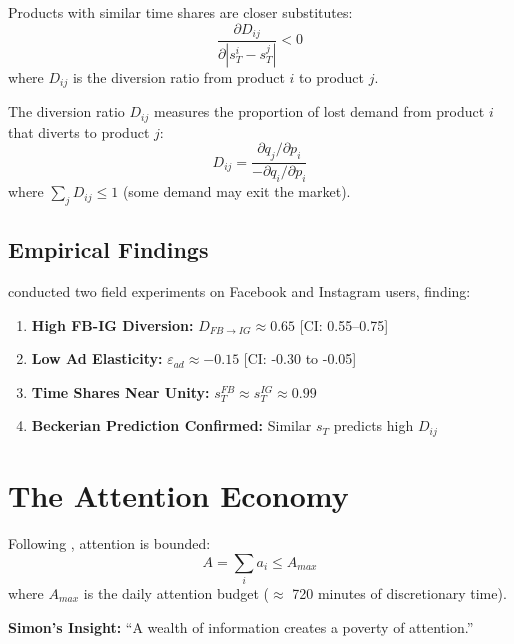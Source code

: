 \begin{axiom}
\label{ax:ta-substitution}
Products with similar time shares are closer substitutes:
\[
\frac{\partial D_{ij}}{\partial |s_T^i - s_T^j|} < 0
\]
where $D_{ij}$ is the diversion ratio from product $i$ to product $j$.
\end{axiom}

\begin{definition}
The diversion ratio $D_{ij}$ measures the proportion of lost demand from product $i$ that diverts to product $j$:
\[
D_{ij} = \frac{\partial q_j / \partial p_i}{-\partial q_i / \partial p_i}
\]
where $\sum_j D_{ij} \leq 1$ (some demand may exit the market).
\end{definition}

\subsection{Empirical Findings}

\citet{goodman2026timeintensive} conducted two field experiments on Facebook and Instagram users, finding:

\begin{tcolorbox}[colback=green!5!white, colframe=green!75!black,
    title=Key Empirical Results (Goodman et al. 2026)]
\begin{enumerate}
\item \textbf{High FB-IG Diversion:} $D_{FB \to IG} \approx 0.65$ [CI: 0.55--0.75]
\item \textbf{Low Ad Elasticity:} $\varepsilon_{ad} \approx -0.15$ [CI: -0.30 to -0.05]
\item \textbf{Time Shares Near Unity:} $s_T^{FB} \approx s_T^{IG} \approx 0.99$
\item \textbf{Beckerian Prediction Confirmed:} Similar $s_T$ predicts high $D_{ij}$
\end{enumerate}
\end{tcolorbox}

\section{The Attention Economy}
\label{sec:pt-attention}

\begin{axiom}
\label{ax:ta-attention}
Following \citet{simon1971designing}, attention is bounded:
\[
A = \sum_i a_i \leq A_{max}
\]
where $A_{max}$ is the daily attention budget ($\approx$ 720 minutes of discretionary time).

\textbf{Simon's Insight:} ``A wealth of information creates a poverty of attention.''
\end{axiom}

